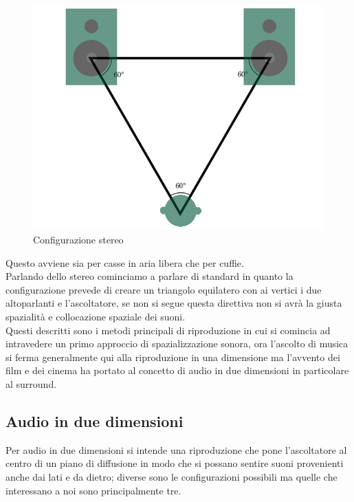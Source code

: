 \documentclass[12pt,a4paper]{report}
\begin{document}
\begin{figure}[htbp]
	\centering
	\includegraphics[scale=0.30]{figures/stereo.jpg}
	\caption {Configurazione stereo} 
	\label{fig:stereo}
	\end{figure}

Questo avviene sia per casse in aria libera che per cuffie. \\

Parlando dello stereo cominciamo a parlare di standard in quanto la configurazione prevede di creare un triangolo equilatero con ai vertici i due altoparlanti e l'ascoltatore, se non si segue questa direttiva non si avrà la giusta spazialità e collocazione spaziale dei suoni.\\

Questi descritti sono i metodi principali di riproduzione in cui si comincia ad intravedere un primo approccio di spazializzazione	 sonora, ora l'ascolto di musica si ferma generalmente qui alla riproduzione in una dimensione ma l'avvento dei film e dei cinema ha portato al concetto di audio in due dimensioni in particolare al surround.

\subsection{Audio in due dimensioni}

Per audio in due dimensioni si intende una riproduzione che pone l'ascoltatore al centro di un piano di diffusione in modo che si possano sentire suoni provenienti anche dai lati e da dietro; diverse sono le configurazioni possibili ma quelle che interessano a noi sono principalmente tre.\\
\end{document}
